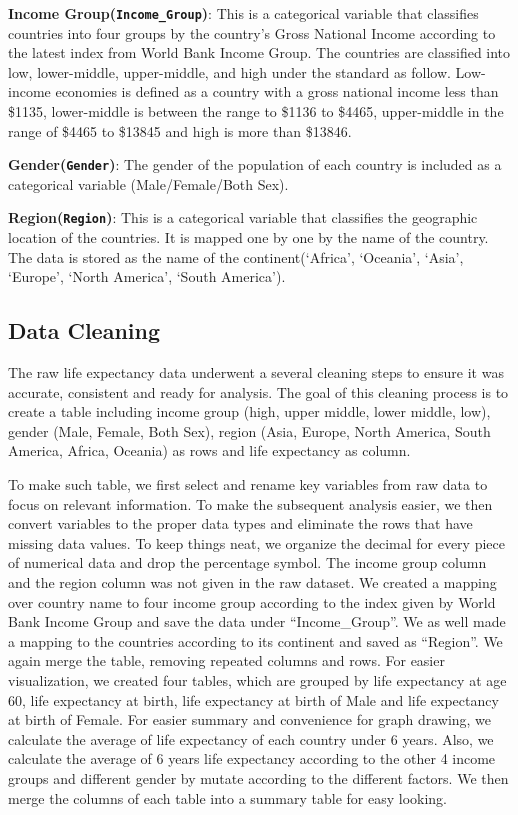 \documentclass[
  letterpaper,
  DIV=11,
  numbers=noendperiod]{scrartcl}
\begin{document}
\textbf{Income Group(\texttt{Income\_Group})}: This is a categorical
variable that classifies countries into four groups by the country's
Gross National Income according to the latest index from World Bank
Income Group. The countries are classified into low, lower-middle,
upper-middle, and high under the standard as follow. Low-income
economies is defined as a country with a gross national income less than
\$1135, lower-middle is between the range to \$1136 to \$4465,
upper-middle in the range of \$4465 to \$13845 and high is more than
\$13846.

\textbf{Gender(\texttt{Gender})}: The gender of the population of each
country is included as a categorical variable (Male/Female/Both Sex).

\textbf{Region(\texttt{Region})}: This is a categorical variable that
classifies the geographic location of the countries. It is mapped one by
one by the name of the country. The data is stored as the name of the
continent(`Africa', `Oceania', `Asia', `Europe', `North America', `South
America').

\subsection{Data Cleaning}\label{data-cleaning}

The raw life expectancy data underwent a several cleaning steps to
ensure it was accurate, consistent and ready for analysis. The goal of
this cleaning process is to create a table including income group (high,
upper middle, lower middle, low), gender (Male, Female, Both Sex),
region (Asia, Europe, North America, South America, Africa, Oceania) as
rows and life expectancy as column.

To make such table, we first select and rename key variables from raw
data to focus on relevant information. To make the subsequent analysis
easier, we then convert variables to the proper data types and eliminate
the rows that have missing data values. To keep things neat, we organize
the decimal for every piece of numerical data and drop the percentage
symbol. The income group column and the region column was not given in
the raw dataset. We created a mapping over country name to four income
group according to the index given by World Bank Income Group and save
the data under ``Income\_Group''. We as well made a mapping to the
countries according to its continent and saved as ``Region''. We again
merge the table, removing repeated columns and rows. For easier
visualization, we created four tables, which are grouped by life
expectancy at age 60, life expectancy at birth, life expectancy at birth
of Male and life expectancy at birth of Female. For easier summary and
convenience for graph drawing, we calculate the average of life
expectancy of each country under 6 years. Also, we calculate the average
of 6 years life expectancy according to the other 4 income groups and
different gender by mutate according to the different factors. We then
merge the columns of each table into a summary table for easy looking.
\end{document}
